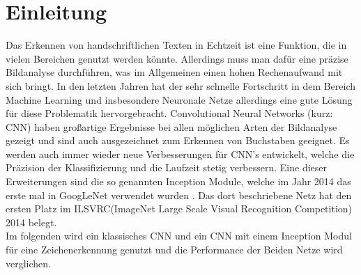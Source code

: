 \documentclass[runningheads,a4paper]{llncs}[2015/06/24]
\begin{document}
\section{Einleitung}\label{sec:intro}
Das Erkennen von handschriftlichen Texten in Echtzeit ist eine Funktion, die in vielen Bereichen genutzt werden könnte. Allerdings muss man dafür eine präzise Bildanalyse durchführen, was im Allgemeinen einen hohen Rechenaufwand mit sich bringt. In den letzten Jahren hat der sehr schnelle Fortschritt in dem Bereich Machine Learning und insbesondere Neuronale Netze allerdings eine gute Lösung für diese Problematik hervorgebracht. Convolutional Neural Networks (kurz: CNN) haben großartige Ergebnisse bei allen möglichen Arten der Bildanalyse gezeigt und sind auch ausgezeichnet zum Erkennen von Buchstaben geeignet. Es werden auch immer wieder neue Verbesserungen für CNN's entwickelt, welche die Präzision der Klassifizierung und die Laufzeit stetig verbessern. Eine dieser Erweiterungen sind die so genannten Inception Module, welche im Jahr 2014 das erste mal in GoogLeNet verwendet wurden \cite{inception_paper}. Das dort beschriebene Netz hat den ersten Platz im ILSVRC(ImageNet Large Scale Visual Recognition Competition) 2014 belegt.\\
Im folgenden wird ein klassisches CNN und ein CNN mit einem Inception Modul für eine Zeichenerkennung genutzt und die Performance der Beiden Netze wird verglichen.\\
\end{document}
